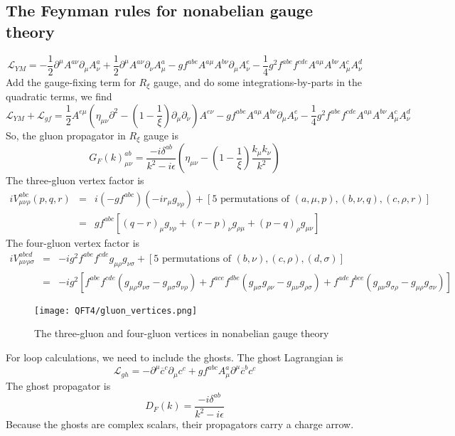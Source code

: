 \documentclass[cyan]{elegantnote}
\begin{document}
\subsection{The Feynman rules for nonabelian gauge theory}
\[\mathcal{L}_{YM} = -\frac{1}{2}\partial^{\mu}A^{a\nu} \partial_{\mu}A^a_{\nu} + \frac{1}{2}\partial^{\mu}A^{a\nu} \partial_{\nu}A^a_{\mu} -gf^{abe}A^{a\mu}A^{b\nu}\partial_{\mu}A^e_{\nu} - \frac{1}{4}g^2 f^{abe}f^{cde}A^{a\mu}A^{b\nu}A^c_{\mu}A^d_{\nu}\]
Add the gauge-fixing term for $R_{\xi}$ gauge, and do some integrations-by-parts in the quadratic terms, we find
\[\mathcal{L}_{YM} + \mathcal{L}_{gf} = \frac{1}{2}A^{e\mu}(\eta_{\mu\nu}\partial^2 -(1-\frac{1}{\xi}) \partial_{\mu}\partial_{\nu})A^{e\nu} -gf^{abe}A^{a\mu}A^{b\nu}\partial_{\mu}A^e_{\nu} - \frac{1}{4}g^2 f^{abe}f^{cde}A^{a\mu}A^{b\nu}A^c_{\mu}A^d_{\nu}\]
So, the gluon propagator in $R_{\xi}$ gauge is
\[G_F(k)^{ab}_{\mu\nu} = \frac{-i\delta^{ab}}{k^2-i\epsilon} \left( \eta_{\mu\nu} - (1 - \frac{1}{\xi}) \frac{k_{\mu}k_{\nu}}{k^2} \right)\]
The three-gluon vertex factor is
\begin{eqnarray}
iV^{abc}_{\mu\nu\rho}(p,q,r) &=& i (-gf^{abc})(-ir_{\mu}g_{\nu\rho}) + [5 \mbox{ permutations of } (a,\mu,p),(b,\nu,q),(c,\rho,r)] \nonumber \\
&=& gf^{abc}[(q-r)_{\mu}g_{\nu\rho} + (r-p)_{\nu}g_{\rho\mu} + (p-q)_{\rho}g_{\mu\nu}] \nonumber
\end{eqnarray}
The four-gluon vertex factor is
\begin{eqnarray}
iV^{abcd}_{\mu\nu\rho\sigma} &=& -ig^2f^{abe} f^{cde} g_{\mu\rho}g_{\nu\sigma} + [5 \mbox{ permutations of } (b,\nu),(c,\rho),(d,\sigma)] \nonumber \\
&=& -ig^2 [f^{abe}f^{cde}(g_{\mu\rho}g_{\nu\sigma} - g_{\mu\sigma}g_{\nu\rho}) + f^{ace}f^{dbe}(g_{\mu\sigma}g_{\rho\nu} - g_{\mu\nu}g_{\rho\sigma}) + f^{ade}f^{bce}(g_{\mu\nu}g_{\sigma\rho} - g_{\mu\rho}g_{\sigma\nu})] \nonumber
\end{eqnarray}

\begin{figure}[!h]
	\centering
	\texttt{[image: QFT4/gluon\_vertices.png]}
	\caption{The three-gluon and four-gluon vertices in nonabelian gauge theory}
\end{figure}

\noindent
For loop calculations, we need to include the ghosts. The ghost Lagrangian is
\[\mathcal{L}_{gh} = -\partial^{\mu}\overline{c}^c \partial_{\mu}c^c + gf^{abc}A^a_{\mu}\partial^{\mu}\overline{c}^b c^c\]
The ghost propagator is
\[D_F(k) = \frac{-i\delta^{ab}}{k^2-i\epsilon}\]
Because the ghosts are complex scalars, their propagators carry a charge arrow. 
\end{document}
